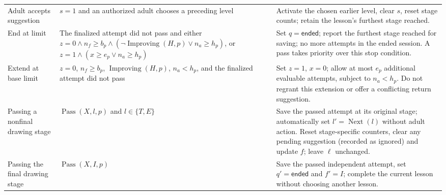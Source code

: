 \documentclass[12pt]{article}
\renewcommand{\_}{\textunderscore\allowbreak}%
\begin{document}
{\begin{longtable}{@{}p{}p{}p{}@{}}
\addlinespace
Adult accepts suggestion & $s=1$ and an authorized adult chooses a preceding
level & Activate the chosen earlier level, clear $s$, reset stage counts; retain
the lesson's furthest stage reached.\\
\addlinespace
End at limit & The finalized attempt did not pass and either $z=0\land n_f\ge
b_p\land (\neg\operatorname{Improving}(H,p)\lor n_a\ge h_p)$, or $z=1\land(x\ge
e_p\lor n_a\ge h_p)$ & Set $q=\textsf{ended}$; report the furthest stage reached
for saving; no more attempts in the ended session. A pass takes priority over
this stop condition.\\
\addlinespace
Extend at base limit & $z=0$, $n_f\ge b_p$, $\operatorname{Improving}(H,p)$,
$n_a<h_p$, and the finalized attempt did not pass & Set $z=1$, $x=0$; allow at
most $e_p$ additional evaluable attempts, subject to $n_a<h_p$. Do not regrant
this extension or offer a conflicting return suggestion.\\
\addlinespace
Passing a nonfinal drawing stage & $\operatorname{Pass}(X,l,p)$ and
$l\in\{T,E\}$ & Save the passed attempt at its original stage; automatically set
$l'=\operatorname{Next}(l)$ without adult action. Reset stage-specific counters,
clear any pending suggestion (recorded as ignored) and update $f$; leave $\ell$
unchanged.\\
\addlinespace
Passing the final drawing stage & $\operatorname{Pass}(X,I,p)$ & Save the passed
independent attempt, set $q'=\textsf{ended}$ and $f'=I$; complete the current
lesson without choosing another lesson.\\
\end{longtable}
}
\end{document}
